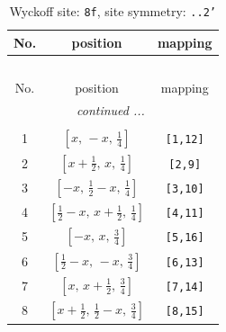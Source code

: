 \documentclass[fleqn,8pt]{jsarticle}
\begin{document}
\begin{longtable}{ccc}
\caption{Wyckoff site: {\tt 8f}, site symmetry: {\tt ..2'}}
 \\
 \hline \hline
No. & position & mapping \\ \hline \endfirsthead

\multicolumn{2}{l}{\tablename\ \thetable{}} \\
 \hline \hline
No. & position & mapping \\ \hline \endhead

 \hline \hline
\multicolumn{2}{r}{\footnotesize\it continued ...} \\ \endfoot

 \hline \hline
\multicolumn{2}{r}{} \\ \endlastfoot

1 & $\left[ x,\, - x,\, \frac{1}{4} \right]$ & {\tt [1,12]} \\ \hline
2 & $\left[ x + \frac{1}{2},\, x,\, \frac{1}{4} \right]$ & {\tt [2,9]} \\ \hline
3 & $\left[ - x,\, \frac{1}{2} - x,\, \frac{1}{4} \right]$ & {\tt [3,10]} \\ \hline
4 & $\left[ \frac{1}{2} - x,\, x + \frac{1}{2},\, \frac{1}{4} \right]$ & {\tt [4,11]} \\ \hline
5 & $\left[ - x,\, x,\, \frac{3}{4} \right]$ & {\tt [5,16]} \\ \hline
6 & $\left[ \frac{1}{2} - x,\, - x,\, \frac{3}{4} \right]$ & {\tt [6,13]} \\ \hline
7 & $\left[ x,\, x + \frac{1}{2},\, \frac{3}{4} \right]$ & {\tt [7,14]} \\ \hline
8 & $\left[ x + \frac{1}{2},\, \frac{1}{2} - x,\, \frac{3}{4} \right]$ & {\tt [8,15]} \\
\end{longtable}
\renewcommand{\arraystretch}{1.2}
\end{document}
